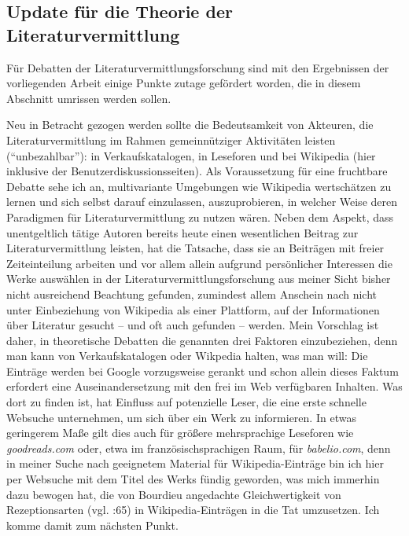 \documentclass[fontsize=12pt]{scrartcl}
\begin{document}
\pagebreak

\subsection{Update f\"ur die Theorie der Literaturvermittlung}
\label{subsec:7.2}

F\"ur Debatten der Li\-te\-ra\-tur\-ver\-mitt\-lungsfor\-schung sind mit den Ergebnissen der vorliegenden Arbeit einige Punkte zutage gef\"ordert worden, die in diesem Abschnitt umrissen werden sollen.

Neu in Betracht gezogen werden sollte die Bedeutsamkeit von Akteuren\textsuperscript{\tiny *}, die Li\-te\-ra\-tur\-ver\-mitt\-lung im Rahmen gemeinn\"utziger Ak\-ti\-vi\-t\"aten leisten ("`unbezahlbar"'): in Verkaufskatalogen, in Leseforen und bei Wi\-ki\-pe\-dia (\mbox{hier} inklusive der Be\-nut\-zerdis\-kus\-si\-onssei\-ten). Als Voraussetzung f\"ur eine fruchtbare Debatte sehe ich an, multivariante Umgebungen wie Wi\-ki\-pe\-dia wertsch\"atzen zu lernen und sich \mbox{selbst} darauf einzulassen, auszuprobieren, in welcher Weise deren Paradigmen f\"ur Li\-te\-ra\-tur\-ver\-mitt\-lung zu nutzen w\"aren. Neben dem Aspekt, dass unentgeltlich t\"atige Autoren\textsuperscript{\tiny *} bereits heute einen we\-sent\-lichen Beitrag zur Li\-te\-ra\-tur\-ver\-mitt\-lung leisten, hat die Tatsache, dass sie an Beitr\"agen mit freier Zeiteinteilung arbei\-ten und vor allem allein aufgrund pers\"onlicher Interessen die Werke ausw\"ahlen in der Li\-te\-ra\-tur\-ver\-mitt\-lungsfor\-schung aus meiner Sicht bis\-her nicht ausreichend Beachtung gefunden, zumindest allem Anschein nach nicht unter Einbeziehung von Wi\-ki\-pe\-dia als einer Plattform, auf der Informationen \"uber Li\-te\-ra\-tur gesucht -- und oft auch gefunden -- werden. Mein Vorschlag ist daher, in theo\-retische Debatten die genannten drei Faktoren einzubeziehen, denn man kann von Verkaufskatalogen oder Wikpedia halten, was man will: Die Eintr\"age werden bei Google vorzugsweise gerankt und schon allein dieses Faktum erfordert eine Auseinandersetzung mit den frei im Web verf\"ugbaren Inhalten. Was dort zu finden ist, hat Einfluss auf potenzielle Leser\textsuperscript{\tiny *}, die eine erste schnelle Websuche unternehmen, um sich \"uber ein Werk zu informieren. In etwas geringerem Ma{\ss}e gilt dies auch f\"ur gr\"o{\ss}ere mehrspra\-chi\-ge Leseforen wie \textit{goodreads.com} oder, etwa im franz\"osischspra\-chi\-gen Raum, f\"ur \textit{babelio.com}, denn in meiner Suche nach ge\-eig\-netem Material f\"ur Wi\-ki\-pe\-dia-Eintr\"age bin ich \mbox{hier} per Websuche mit dem Titel des Werks f\"undig geworden, was mich immerhin dazu bewogen hat, die von Bourdieu angedachte Gleichwertigkeit von Rezeptionsarten (vgl. \cite{Zahner2010}:65) in Wi\-ki\-pe\-dia-Eintr\"agen in die Tat umzusetzen. Ich komme damit zum n\"achsten Punkt.
\end{document}
